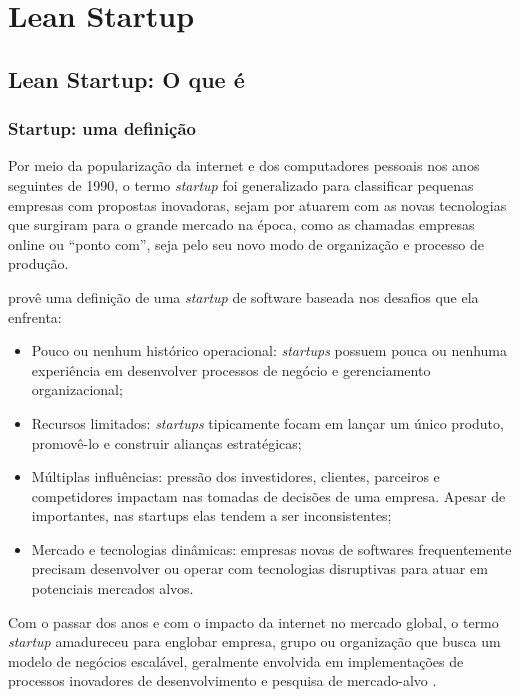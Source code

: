 \chapter{Lean Startup}
\label{cap:leanstartup}
\section{Lean Startup: O que é}
\subsection{Startup: uma definição}
\par Por meio da popularização da internet e dos computadores pessoais nos anos seguintes de 1990, o termo \emph{startup} foi generalizado para classificar pequenas empresas com propostas inovadoras, sejam por atuarem com as novas tecnologias que surgiram para o grande mercado na época, como as chamadas empresas online ou ``ponto com'', seja pelo seu novo modo de organização e processo de produção.
\par \cite{nicolo:14} provê uma definição de uma \emph{startup} de software baseada nos desafios que ela enfrenta:
\begin{itemize}
\item Pouco ou nenhum histórico operacional: \emph{startups} possuem pouca ou nenhuma experiência em desenvolver processos de negócio e gerenciamento organizacional;
\item Recursos limitados: \emph{startups} tipicamente focam em lançar um único produto, promovê-lo e construir alianças estratégicas;
\item Múltiplas influências: pressão dos investidores, clientes, parceiros e competidores impactam nas tomadas de decisões de uma empresa. Apesar de importantes, nas startups elas tendem a ser inconsistentes;
\item Mercado e tecnologias dinâmicas: empresas novas de softwares frequentemente precisam desenvolver ou operar com tecnologias disruptivas para atuar em potenciais mercados alvos.
\end{itemize}

\par Com o passar dos anos e com o impacto da internet no mercado global, o termo \emph{startup} amadureceu para englobar empresa, grupo ou organização que busca um modelo de negócios escalável, geralmente envolvida em implementações de processos inovadores de desenvolvimento e pesquisa de mercado-alvo \citep{blank:03}.

